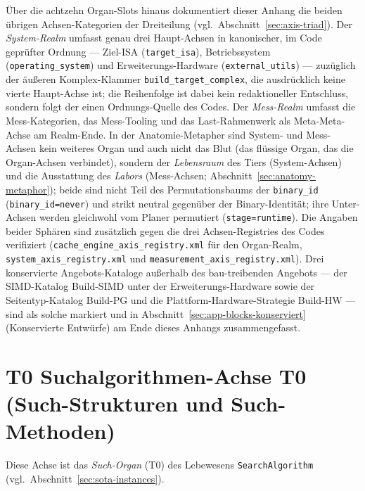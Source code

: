Über die achtzehn Organ-Slots hinaus dokumentiert dieser Anhang die beiden übrigen Achsen-Kategorien der Dreiteilung (vgl.\ Abschnitt~\ref{sec:axis-triad}). Der \emph{System-Realm} umfasst genau drei Haupt-Achsen in kanonischer, im Code geprüfter Ordnung --- Ziel-ISA (\texttt{target\_\allowbreak{}isa}), Betriebssystem (\texttt{operating\_\allowbreak{}system}) und Erweiterungs-Hardware (\texttt{external\_\allowbreak{}utils}) --- zuzüglich der äußeren Komplex-Klammer \texttt{build\_\allowbreak{}target\_\allowbreak{}complex}, die ausdrücklich keine vierte Haupt-Achse ist; die Reihenfolge ist dabei kein redaktioneller Entschluss, sondern folgt der einen Ordnungs-Quelle des Codes. Der \emph{Mess-Realm} umfasst die Mess-Kategorien, das Mess-Tooling und das Last-Rahmenwerk als Meta-Meta-Achse am Realm-Ende. In der Anatomie-Metapher sind System- und Mess-Achsen kein weiteres Organ und auch nicht das Blut (das flüssige Organ, das die Organ-Achsen verbindet), sondern der \emph{Lebensraum} des Tiers (System-Achsen) und die Ausstattung des \emph{Labors} (Mess-Achsen; Abschnitt~\ref{sec:anatomy-metaphor}); beide sind nicht Teil des Permutationsbaums der \texttt{binary\_\allowbreak{}id} (\texttt{binary\_\allowbreak{}id=never}) und strikt neutral gegenüber der Binary-Identität; ihre Unter-Achsen werden gleichwohl vom Planer permutiert (\texttt{stage=runtime}). Die Angaben beider Sphären sind zusätzlich gegen die drei Achsen-Registries des Codes verifiziert (\texttt{cache\_\allowbreak{}engine\_\allowbreak{}axis\_\allowbreak{}registry.xml} für den Organ-Realm, \texttt{system\_\allowbreak{}axis\_\allowbreak{}registry.xml} und \texttt{measurement\_\allowbreak{}axis\_\allowbreak{}registry.xml}). Drei konservierte Angebots-Kataloge außerhalb des bau-treibenden Angebots --- der SIMD-Katalog Build-SIMD unter der Erweiterungs-Hardware sowie der Seitentyp-Katalog Build-PG und die Plattform-Hardware-Strategie Build-HW --- sind als solche markiert und in Abschnitt~\ref{sec:app-blocks-konserviert} (Konservierte Entwürfe) am Ende dieses Anhangs zusammengefasst.

\setlength{\tabcolsep}{3pt}
\section[head={T0 Suchalgorithmen-Achse (Such-Strukturen und -Methoden)}]{T0 Suchalgorithmen-Achse T0 (Such-Strukturen und Such-Methoden)}

Diese Achse ist das \emph{Such-Organ} (T0) des Lebewesens \texttt{SearchAlgorithm} (vgl.\ Abschnitt~\ref{sec:sota-instances}).

